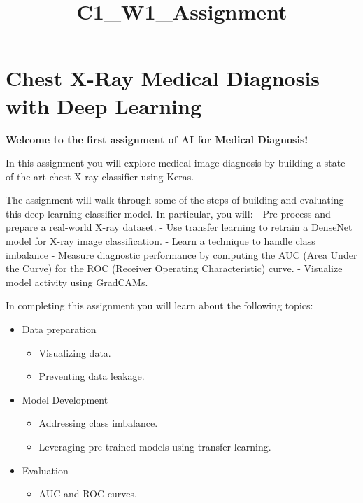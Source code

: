 \documentclass[11pt]{article}
\title{C1\_W1\_Assignment}
\providecommand{\tightlist}{%
      \setlength{\itemsep}{0pt}\setlength{\parskip}{0pt}}
\begin{document}
    
    
    \maketitle
    
    

    
    \hypertarget{chest-x-ray-medical-diagnosis-with-deep-learning}{%
\section{Chest X-Ray Medical Diagnosis with Deep
Learning}\label{chest-x-ray-medical-diagnosis-with-deep-learning}}

    \textbf{Welcome to the first assignment of AI for Medical Diagnosis!}

In this assignment you will explore medical image diagnosis by building
a state-of-the-art chest X-ray classifier using Keras.

The assignment will walk through some of the steps of building and
evaluating this deep learning classifier model. In particular, you will:
- Pre-process and prepare a real-world X-ray dataset. - Use transfer
learning to retrain a DenseNet model for X-ray image classification. -
Learn a technique to handle class imbalance - Measure diagnostic
performance by computing the AUC (Area Under the Curve) for the ROC
(Receiver Operating Characteristic) curve. - Visualize model activity
using GradCAMs.

In completing this assignment you will learn about the following topics:

\begin{itemize}
\tightlist
\item
  Data preparation

  \begin{itemize}
  \tightlist
  \item
    Visualizing data.
  \item
    Preventing data leakage.
  \end{itemize}
\item
  Model Development

  \begin{itemize}
  \tightlist
  \item
    Addressing class imbalance.
  \item
    Leveraging pre-trained models using transfer learning.
  \end{itemize}
\item
  Evaluation

  \begin{itemize}
  \tightlist
  \item
    AUC and ROC curves.
  \end{itemize}
\end{itemize}
\end{document}
